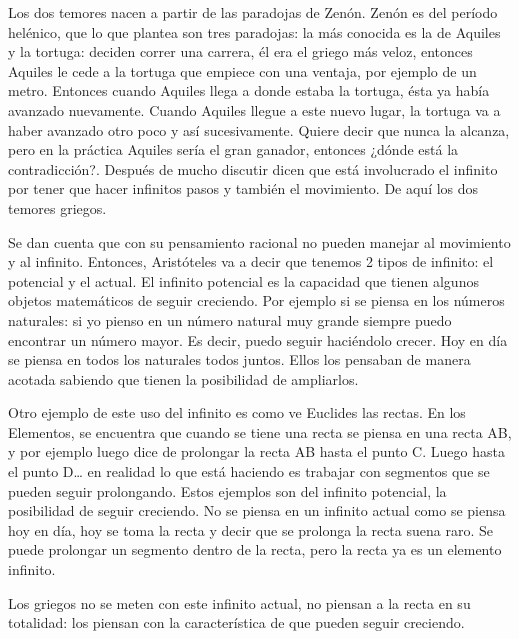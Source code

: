 Los dos temores nacen a partir de las paradojas de Zenón. Zenón es del período helénico, que lo que plantea son tres paradojas: la más conocida es la de Aquiles y la tortuga: deciden correr una carrera, él era el griego más veloz, entonces Aquiles le cede a la tortuga que empiece con una ventaja, por ejemplo de un metro. Entonces cuando Aquiles llega a donde estaba la tortuga, ésta ya había avanzado nuevamente. Cuando Aquiles llegue a este nuevo lugar, la tortuga va a haber avanzado otro poco y así sucesivamente. Quiere decir que nunca la alcanza, pero en la práctica Aquiles sería el gran ganador, entonces ¿dónde está la contradicción?. Después de mucho discutir dicen que está involucrado el infinito por tener que hacer infinitos pasos y también el movimiento. De aquí los dos temores griegos. 

Se dan cuenta que con su pensamiento racional no pueden manejar al movimiento y al infinito. Entonces, Aristóteles va a decir que tenemos 2 tipos de infinito: el potencial y el actual. El infinito potencial es la capacidad que tienen algunos objetos matemáticos de seguir creciendo. Por ejemplo si se piensa en los números naturales: si yo pienso en un número natural muy grande siempre puedo encontrar un número mayor. Es decir, puedo seguir haciéndolo crecer. Hoy en día se piensa en todos los naturales todos juntos. Ellos los pensaban de manera acotada sabiendo que tienen la posibilidad de ampliarlos. 

Otro ejemplo de este uso del infinito es como ve Euclides las rectas. En los Elementos, se encuentra que cuando se tiene una recta se piensa en una recta AB, y por ejemplo luego dice de prolongar la recta AB hasta el punto C. Luego hasta el punto D… en realidad lo que está haciendo es trabajar con segmentos que se pueden seguir prolongando. Estos ejemplos son del infinito potencial, la posibilidad de seguir creciendo. No se piensa en un infinito actual como se piensa hoy en día, hoy se toma la recta y decir que se prolonga la recta suena raro. Se puede prolongar un segmento dentro de la recta, pero la recta ya es un elemento infinito. 

Los griegos no se meten con este infinito actual, no piensan a la recta en su totalidad: los piensan con la característica de que pueden seguir creciendo.
